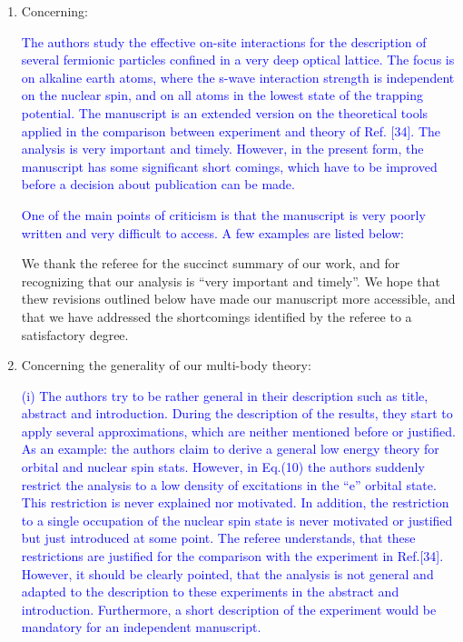 \documentclass[preprint]{revtex4-1}
\newcommand{\1}{\mathds{1}}
\newcommand{\blue}[1]{\textcolor{blue}{#1}}
\begin{document}
\begin{enumerate}
\item Concerning:

  \blue{The authors study the effective on-site interactions for the
    description of several fermionic particles confined in a very deep
    optical lattice. The focus is on alkaline earth atoms, where the
    s-wave interaction strength is independent on the nuclear spin,
    and on all atoms in the lowest state of the trapping
    potential. The manuscript is an extended version on the
    theoretical tools applied in the comparison between experiment and
    theory of Ref. [34].  The analysis is very important and
    timely. However, in the present form, the manuscript has some
    significant short comings, which have to be improved before a
    decision about publication can be made.}

  \blue{One of the main points of criticism is that the manuscript is
    very poorly written and very difficult to access. A few examples
    are listed below:}

  We thank the referee for the succinct summary of our work, and for
  recognizing that our analysis is ``very important and timely''.  We
  hope that thew revisions outlined below have made our manuscript
  more accessible, and that we have addressed the shortcomings
  identified by the referee to a satisfactory degree.


\item Concerning the generality of our multi-body theory:

  \blue{(i) The authors try to be rather general in their description
    such as title, abstract and introduction. During the description
    of the results, they start to apply several approximations, which
    are neither mentioned before or justified.  As an example: the
    authors claim to derive a general low energy theory for orbital
    and nuclear spin stats. However, in Eq.(10) the authors suddenly
    restrict the analysis to a low density of excitations in the ``e''
    orbital state. This restriction is never explained nor motivated.
    In addition, the restriction to a single occupation of the nuclear
    spin state is never motivated or justified but just introduced at
    some point. The referee understands, that these restrictions are
    justified for the comparison with the experiment in
    Ref.[34]. However, it should be clearly pointed, that the analysis
    is not general and adapted to the description to these experiments
    in the abstract and introduction. Furthermore, a short description
    of the experiment would be mandatory for an independent
    manuscript.}


\end{enumerate}
\end{document}
